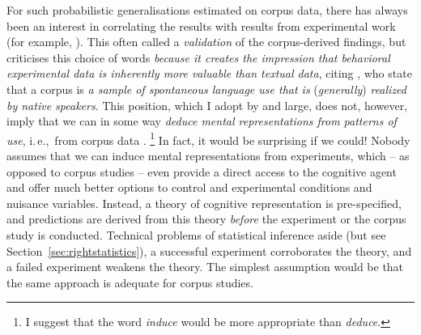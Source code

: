 \documentclass[USenglish]{article}
\newcommand{\ie}{i.\,e.,}
\begin{document}
For such probabilistic generalisations estimated on corpus data, there has always been an interest in correlating the results with results from experimental work (for example, \citealp{ArppeJaervikivi2007,BresnanEa2007,BresnanFord2010,DivjakGries2008,DivjakEa2016,FordBresnan2013}).
This often called a \textit{validation} of the corpus-derived findings, but \citet[303]{Divjak2016a} criticises this choice of words \textit{because it creates the impression that behavioral experimental data is inherently more valuable than textual data}, citing \cite{TummersEa2005}, who state that a corpus is \textit{a sample of spontaneous language use that is} (\textit{generally}) \textit{realized by native speakers}.
This position, which I adopt by and large, does not, however, imply that we can in some way \textit{deduce mental representations from patterns of use}, \ie\ from corpus data \citep[486--487]{Dabrowska2016}.%
\footnote{I suggest that the word \textit{induce} would be more appropriate than \textit{deduce}.}
In fact, it would be surprising if we could!
Nobody assumes that we can induce mental representations from experiments, which -- as opposed to corpus studies -- even provide a direct access to the cognitive agent and offer much better options to control and experimental conditions and nuisance variables.
Instead, a theory of cognitive representation is pre-specified, and predictions are derived from this theory \textit{before} the experiment or the corpus study is conducted.
Technical problems of statistical inference aside (but see Section~\ref{sec:rightstatistics}), a successful experiment corroborates the theory, and a failed experiment weakens the theory.
The simplest assumption would be that the same approach is adequate for corpus studies.
\end{document}
